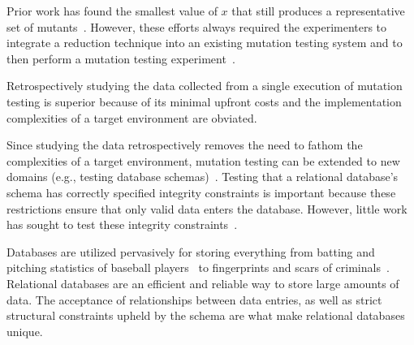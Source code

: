 

Prior work has found the smallest value of $x$ that still produces a representative set of
mutants~\cite{jia2011analysis, mathur1994empirical}. However, these efforts always required the experimenters to
integrate a reduction technique into an existing mutation testing system and to then perform a mutation testing
experiment~\cite{demillo1988extended, king1991fortran}.

Retrospectively studying the data
collected from a single execution of mutation testing is superior
because of its minimal upfront costs and the implementation complexities of
a target environment are obviated.

Since studying the data retrospectively removes the need to fathom the complexities of a target environment, mutation
testing can be extended to new domains (e.g., testing database schemas)~\cite{mcminn2016virtual,
mcminn2015effectiveness, wright2013efficient}.  Testing that a relational database's schema has correctly specified
integrity constraints is important because these restrictions ensure that only valid data enters the database. However,
little work has sought to test these integrity constraints~\cite{mcminn2016virtual}.

Databases are utilized pervasively for storing everything from batting and pitching statistics of baseball
players~\cite{lahmanbaseball} to fingerprints and scars of criminals~\cite{ngi}.  Relational databases are an efficient
and reliable way to store large amounts of data.  The acceptance of relationships between data entries, as well as
strict structural constraints upheld by the schema are what make relational databases unique.

